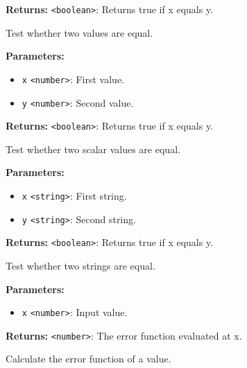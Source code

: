 \documentclass[12pt,a4paper]{article}
\begin{document}
\noindent \textbf{Returns:} \texttt{<boolean>}: Returns true if x equals y.

\noindent Test whether two values are equal.

\vspace{5mm}
\noindent {}


\noindent \textbf{Parameters:}
\begin{itemize}
  \item \texttt{x} \texttt{<number>}: First value.
  \item \texttt{y} \texttt{<number>}: Second value.
\end{itemize}

\noindent \textbf{Returns:} \texttt{<boolean>}: Returns true if x equals y.

\noindent Test whether two scalar values are equal.

\vspace{5mm}
\noindent {}


\noindent \textbf{Parameters:}
\begin{itemize}
  \item \texttt{x} \texttt{<string>}: First string.
  \item \texttt{y} \texttt{<string>}: Second string.
\end{itemize}

\noindent \textbf{Returns:} \texttt{<boolean>}: Returns true if x equals y.

\noindent Test whether two strings are equal.

\vspace{5mm}
\noindent {}


\noindent \textbf{Parameters:}
\begin{itemize}
  \item \texttt{x} \texttt{<number>}: Input value.
\end{itemize}

\noindent \textbf{Returns:} \texttt{<number>}: The error function evaluated at x.

\noindent Calculate the error function of a value.
\end{document}
